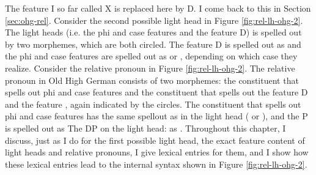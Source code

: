 The feature I so far called X is replaced here by D. I come back to this in Section \ref{sec:ohg-rel}.
Consider the second possible light head in Figure \ref{fig:rel-lh-ohg-2}.
The light heads (i.e. the phi and case features and the feature D) is spelled out by two morphemes, which are both circled. The feature D is spelled out as  and the phi and case features are spelled out as  or , depending on which case they realize.
Consider the relative pronoun in Figure \ref{fig:rel-lh-ohg-2}.
The relative pronoun in Old High German consists of two morphemes: the constituent that spells out phi and case features and the constituent that spells out the feature D and the feature , again indicated by the circles. The constituent that spells out phi and case features has the same spellout as in the light head ( or ), and the P is spelled out as The DP on the light head: as .
Throughout this chapter, I discuss, just as I do for the first possible light head, the exact feature content of light heads and relative pronouns, I give lexical entries for them, and I show how these lexical entries lead to the internal syntax shown in Figure \ref{fig:rel-lh-ohg-2}.

